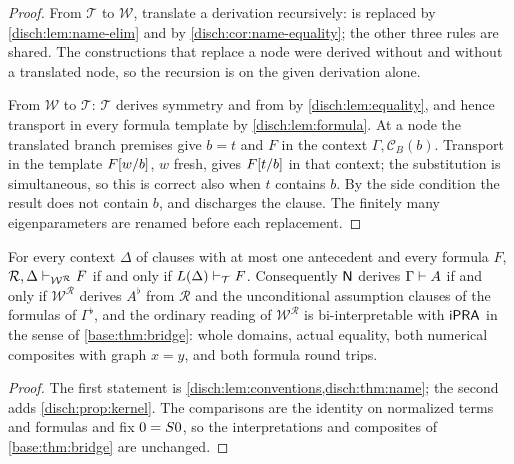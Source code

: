 \begin{proof}
From $\mathcal T$ to $\mathcal W$, translate a derivation recursively:
 is replaced by \cref{disch:lem:name-elim} and
 by \cref{disch:cor:name-equality}; the other three rules are
shared. The constructions that replace a  node were derived
without  and without a translated node, so the recursion is
on the given derivation alone.

From $\mathcal W$ to $\mathcal T$: $\mathcal T$ derives symmetry and
 from  by \cref{disch:lem:equality}, and hence
transport in every formula template by \cref{disch:lem:formula}. At a
 node the translated branch premises give $b=t$ and $F$ in
the context $\Gamma,\mathcal C_B(b)$. Transport in the template
$F[w/b]$, $w$ fresh, gives $F[t/b]$ in that context; the
substitution is simultaneous, so this is correct also when $t$ contains
$b$. By the side condition the result does not contain $b$, and
 discharges the clause. The finitely many eigenparameters
are renamed before each replacement.
\end{proof}

\begin{corollary}
\label{disch:cor:name-three}
For every context $\Delta$ of clauses with at most one antecedent and every
formula $F$,
$\mathcal R,\Delta\vdash_{\mathcal W^{\mathcal R}}F$ if and only if
$L(\Delta)\vdash_{\mathcal T}F$. Consequently $\mathsf{N}$ derives
$\Gamma\vdash A$ if and only if $\mathcal W^{\mathcal R}$ derives
$A^{\flat}$ from $\mathcal R$ and the unconditional assumption clauses of
the formulas of $\Gamma^{\flat}$, and the ordinary reading of
$\mathcal W^{\mathcal R}$ is bi-interpretable with $\mathsf{iPRA}$ in the sense of
\cref{base:thm:bridge}: whole domains, actual equality, both numerical
composites with graph $x=y$, and both formula round trips.
\end{corollary}

\begin{proof}
The first statement is \cref{disch:lem:conventions,disch:thm:name}; the
second adds \cref{disch:prop:kernel}. The comparisons are the identity on
normalized terms and formulas and fix $0=S 0$, so the interpretations
and composites of \cref{base:thm:bridge} are unchanged.
\end{proof}

